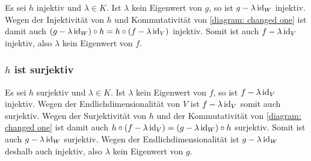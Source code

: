 Es sei $h$ injektiv und $\lambda \in K$.
Ist $\lambda$ kein Eigenwert von $g$, so ist $g - \lambda \operatorname{id}_W$ injektiv.
Wegen der Injektivität von $h$ und Kommutativität von \eqref{diagram: changed one} ist damit auch $(g - \lambda \operatorname{id}_W) \circ h = h \circ (f - \lambda \operatorname{id}_V)$ injektiv.
Somit ist auch $f - \lambda \operatorname{id}_V$ injektiv, also $\lambda$ kein Eigenwert von $f$.



\subsubsection{\texorpdfstring{$h$}{h} ist surjektiv}

Es sei $h$ surjektiv und $\lambda \in K$.
Ist $\lambda$ kein Eigenwert von $f$, so ist $f - \lambda \operatorname{id}_V$ injektiv.
Wegen der Endlichdimensionalität von $V$ ist $f - \lambda \operatorname{id}_V$ somit auch surjektiv.
Wegen der Surjektivität von $h$ und der Kommutativität von \eqref{diagram: changed one} ist damit auch $h \circ (f - \lambda \operatorname{id}_V) = (g - \lambda \operatorname{id}_W) \circ h$ surjektiv.
Somit ist auch $g - \lambda \operatorname{id}_W$ surjektiv.
Wegen der Endlichdimensionalität ist $g - \lambda \operatorname{id}_W$ deshalb auch injektiv, also $\lambda$ kein Eigenwert von $g$.

